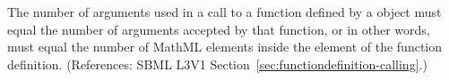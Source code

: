 The number of arguments used in a call to a function defined by a
\FunctionDefinition object must equal the number of arguments accepted by
that function, or in other words, must equal the number of MathML
 elements inside the  element of the function
definition.  (References: SBML L3V1
Section~\ref{sec:functiondefinition-calling}.)
